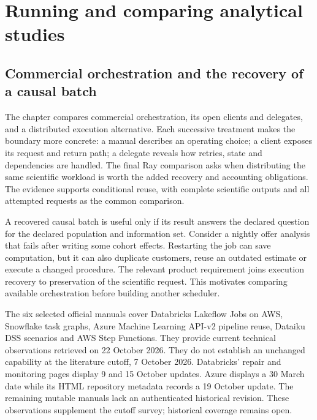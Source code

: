 \chapter{Running and comparing analytical studies}




\section{Commercial orchestration and the recovery of a causal batch}
\label{exec22:workflow-scope}

The chapter compares commercial orchestration, its open clients and delegates, and a distributed execution alternative. Each successive treatment makes the boundary more concrete: a manual describes an operating choice; a client exposes its request and return path; a delegate reveals how retries, state and dependencies are handled. The final Ray comparison asks when distributing the same scientific workload is worth the added recovery and accounting obligations. The evidence supports conditional reuse, with complete scientific outputs and all attempted requests as the common comparison.

A recovered causal batch is useful only if its result answers the declared
question for the declared population and information set. Consider a nightly
offer analysis that fails after writing some cohort effects. Restarting the job
can save computation, but it can also duplicate customers, reuse an outdated
estimate or execute a changed procedure. The relevant product requirement joins
execution recovery to preservation of the scientific request. This motivates
comparing available orchestration before building another scheduler.

The six selected official manuals cover Databricks Lakeflow Jobs on AWS,
Snowflake task graphs, Azure Machine Learning API-v2 pipeline reuse, Dataiku
DSS scenarios and AWS Step Functions. They provide current technical
observations retrieved on 22 October 2026. They do not establish an unchanged
capability at the literature cutoff, 7 October 2026. Databricks' repair and
monitoring pages display 9 and 15 October updates. Azure displays a 30 March
date while its HTML repository metadata records a 19 October update. The
remaining mutable manuals lack an authenticated historical revision. These
observations supplement the cutoff survey; historical coverage remains open.
\citep{exec22_workflow_databricks_repair,exec22_workflow_databricks_monitor,
exec22_workflow_azure_reuse,exec22_workflow_snowflake_graphs,
exec22_workflow_dataiku_scenarios,exec22_workflow_aws_errors}

